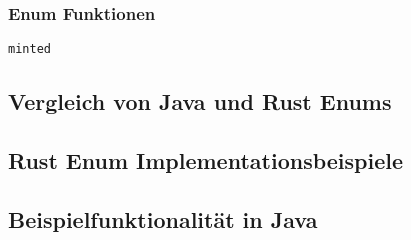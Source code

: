 \documentclass[a4paper, 1ppt]{article}
\begin{document}
\subsubsection{Enum Funktionen}
\begin{verbatim}
minted\end{verbatim}
\subsection{Vergleich von Java und Rust Enums}
\subsection{Rust Enum Implementationsbeispiele}
\subsubsection{}
\subsection{Beispielfunktionalität in Java}
\end{document}
